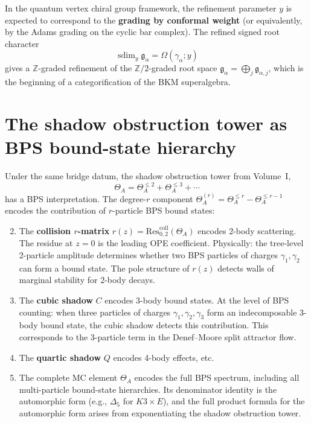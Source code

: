 \documentclass[11pt]{article}
\theoremstyle{definition}
\newcommand{\sdim}{\operatorname{sdim}}
\newcommand{\bZ}{\mathbb{Z}}
\begin{document}
In the quantum vertex chiral group framework, the refinement
parameter $y$ is expected to correspond to the \textbf{grading by conformal
weight} (or equivalently, by the Adams grading on the cyclic bar
complex). The refined signed root character
\[
 \sdim_y\mathfrak g_\alpha = \Omega(\gamma_\alpha; y)
\]
 gives a $\bZ$-graded refinement of the $\bZ/2$-graded root space
$\mathfrak{g}_\alpha = \bigoplus_j \mathfrak{g}_{\alpha,j}$, which
is the beginning of a categorification of the BKM superalgebra.

\section{The shadow obstruction tower as BPS bound-state hierarchy}
\label{sec:shadow-hierarchy}

Under the same bridge datum, the shadow obstruction tower from Volume~I,
\[
 \Theta_A = \Theta^{\leq 2}_A + \Theta^{\leq 3}_A + \cdots
\]
has a BPS interpretation. The degree-$r$ component
$\Theta^{(r)}_A = \Theta^{\leq r}_A - \Theta^{\leq r-1}_A$
encodes the contribution of $r$-particle BPS bound states:

\begin{enumerate}[label=\textbf{Degree \arabic*}:]
 \setcounter{enumi}{1}

 \item The \textbf{collision $r$-matrix}
 $r(z) = \mathrm{Res}^{\mathrm{coll}}_{0,2}(\Theta_A)$ encodes
 2-body scattering. The residue at $z = 0$ is the leading OPE
 coefficient. Physically: the tree-level 2-particle amplitude
 determines whether two BPS particles of charges $\gamma_1,
 \gamma_2$ can form a bound state. The pole structure of $r(z)$
 detects walls of marginal stability for 2-body decays.

 \item The \textbf{cubic shadow} $C$ encodes 3-body bound states.
 At the level of BPS counting: when three particles of charges
 $\gamma_1, \gamma_2, \gamma_3$ form an indecomposable 3-body bound
 state, the cubic shadow detects this contribution. This corresponds
 to the 3-particle term in the Denef--Moore split attractor flow.

 \item The \textbf{quartic shadow} $Q$ encodes 4-body effects, etc.

 \item[Full tower:] The complete MC element $\Theta_A$ encodes the
 full BPS spectrum, including all multi-particle bound-state
 hierarchies. Its denominator identity is the automorphic form
 (e.g., $\Delta_5$ for $K3 \times E$), and the full product
 formula for the automorphic form arises from exponentiating the
 shadow obstruction tower.
\end{enumerate}
\end{document}
